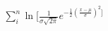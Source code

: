 \documentclass[preview]{standalone}
\begin{document}
\begin{align*}
\sum_i^n \ln [ \frac{1}{\sigma \sqrt{2 \pi}} e^{-\frac{1}{2}\left(\frac{x-\mu}{\sigma}\right)^2 ]}
\end{align*}
\end{document}
